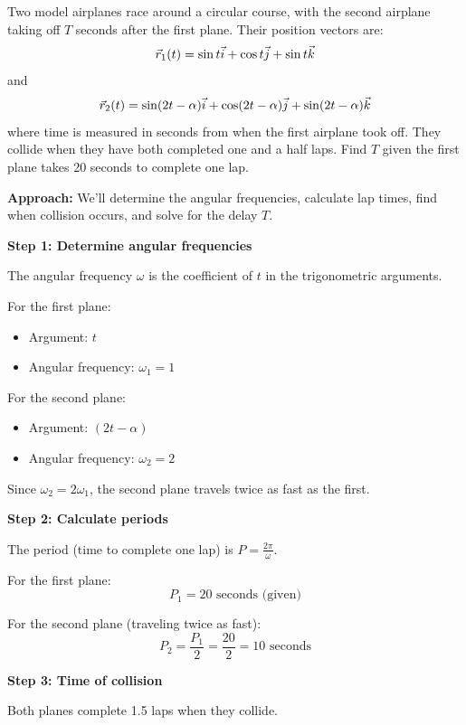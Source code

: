 \newpage

\begin{problem}
Two model airplanes race around a circular course, with the second airplane taking off $T$ seconds after the first plane. Their position vectors are:
\[
\vec{r}_1(t) = \sin t \vec{i} + \cos t \vec{j} + \sin t \vec{k}
\]
and
\[
\vec{r}_2(t) = \sin(2t - \alpha) \vec{i} + \cos(2t - \alpha) \vec{j} + \sin(2t - \alpha) \vec{k}
\]
where time is measured in seconds from when the first airplane took off. They collide when they have both completed one and a half laps. Find $T$ given the first plane takes 20 seconds to complete one lap.
\end{problem}

\begin{solution}
\textbf{Approach:} We'll determine the angular frequencies, calculate lap times, find when collision occurs, and solve for the delay $T$.

\textbf{Step 1: Determine angular frequencies}

The angular frequency $\omega$ is the coefficient of $t$ in the trigonometric arguments.

For the first plane:
\begin{itemize}
    \item Argument: $t$
    \item Angular frequency: $\omega_1 = 1$
\end{itemize}

For the second plane:
\begin{itemize}
    \item Argument: $(2t - \alpha)$
    \item Angular frequency: $\omega_2 = 2$
\end{itemize}

Since $\omega_2 = 2\omega_1$, the second plane travels twice as fast as the first.

\textbf{Step 2: Calculate periods}

The period (time to complete one lap) is $P = \frac{2\pi}{\omega}$.

For the first plane:
\[ P_1 = 20 \text{ seconds (given)} \]

For the second plane (traveling twice as fast):
\[ P_2 = \frac{P_1}{2} = \frac{20}{2} = 10 \text{ seconds} \]

\textbf{Step 3: Time of collision}

Both planes complete 1.5 laps when they collide.


\end{solution}
